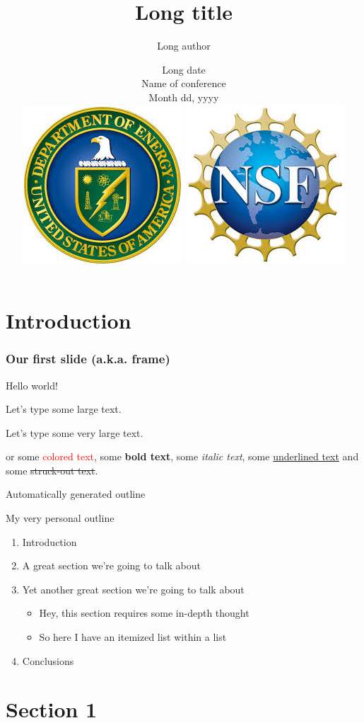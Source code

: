 \documentclass[aspectratio=169,mathserif,10pt]{beamer}
\title[short title]{Long title}
\author[short author]{Long author}
\institute[Short institute]{Full institute: \\
University of Colorado Boulder}
\date[Short date]{
    Long date \\ 
    Name of conference \\ 
    Month dd, yyyy\\
    \centering
    \vspace{.7cm}
    \includegraphics[scale=0.2]{Images/DOELogo.jpg}
    \hspace{2cm}
    \includegraphics[scale=0.22]{Images/NSFLogo}
}
\newcommand{\nologo}{\setbeamertemplate{logo}{}}
\newcommand{\newslide}[2]
{\begin{frame}{#1}
\begin{center}
{#2}
\end{center}
\end{frame}}
\begin{document}
	
{\nologo 
    {
        \begin{frame}[noframenumbering]
            \maketitle
        \end{frame}
    }
}

\section[Intro]{Introduction}

\begin{frame}
\frametitle{Our first slide (a.k.a. frame)}
    
Hello world!

\pause
\Large{Let's type some large text.}

\pause
\LARGE{Let's type some very large text.}

\pause 
or some \textcolor{red}{colored text}, some \textbf{bold text}, some \emph{italic text}, some \underline{underlined text} and some \st{struck-out text}.
    
\end{frame}

\newslide{Automatically generated outline}{
    \tableofcontents
}

\newslide{My very personal outline}{

\begin{enumerate}
    \item Introduction
    \item A great section we're going to talk about
    \item Yet another great section we're going to talk about
    \begin{itemize}
        \item Hey, this section requires some in-depth thought
        \item So here I have an itemized list within a list
    \end{itemize}
    \item Conclusions
\end{enumerate}

}

\section[Sec. 1]{Section 1}
\end{document}
